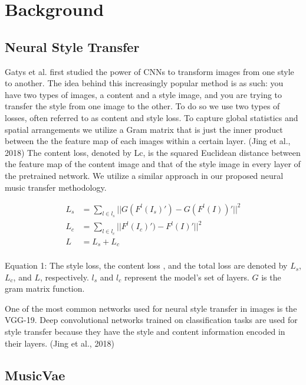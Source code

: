 \documentclass{article}
\begin{document}
\section{Background}
\label{background}

\subsection{Neural Style Transfer}

Gatys et al. first studied the power of CNNs to transform images from one style to another. The idea behind this increasingly popular method is as such: you have two types of images, a content and a style image, and you are trying to transfer the style from one image to the other. To do so we use two types of losses, often referred to as content and style loss. To capture global statistics and spatial arrangements we utilize a Gram matrix that is just the inner product between the the feature map of each images within a certain layer. (Jing et al., 2018) The content loss, denoted by Lc, is the squared Euclidean distance between the feature map of the content image and that of the style image in every layer of the pretrained network. We utilize a similar approach in our proposed neural music transfer methodology. 

\begin{equation} 
\begin{split}
	L_s & = \sum_{l \in {l_s}} || G(F^l(I_s)') - G(F^l(I))'||^2 \\
	L_c & = \sum_{l \in {l_c}} || F^l(I_c)') -  F^l(I)'||^2 \\
	L & = L_s + L_c \\
\end{split} 
\end{equation}

Equation 1: The style loss, the content loss , and the total loss are denoted by $L_s$, $L_c$, and $L$, respectively. ${l_s}$ and ${l_c}$ represent the model’s set of layers. $G$ is the gram matrix function. 

One of the most common networks used for neural style transfer in images is the VGG-19. Deep convolutional networks trained on classification tasks are used for style transfer because they have the style and content information encoded in their layers. (Jing et al., 2018)

\medskip

\subsection{MusicVae}
\end{document}
